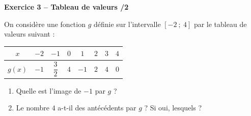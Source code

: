 \documentclass[10pt,a4paper]{article}
\begin{document}
\vspace{0.8cm}

\textbf{Exercice 3 -- Tableau de valeurs \hfill /2}

On considère une fonction \(g\) définie sur l'intervalle \([-2\ ;\ 4]\) par le tableau de valeurs suivant :
\begin{center}
\begin{tabular}{|*{8}{c|}}
    \hline
    \(x\) & \(-2\) & \(-1\) & \(0\) & \(1\) & \(2\) & \(3\) & \(4\) \\
    \hline
    \(g(x)\) & \(-1\) & \(\dfrac{3}{2}\) & \(4\) & \(-1\) & \(2\) & \(4\) & \(0\) \\
    \hline
\end{tabular}
\end{center}

\begin{enumerate}
    \item Quelle est l'image de \(-1\) par \(g\) ?
    \vspace{1.2cm}
    \item Le nombre \(4\) a-t-il des antécédents par \(g\) ? Si oui, lesquels ?
\end{enumerate}
\end{document}
